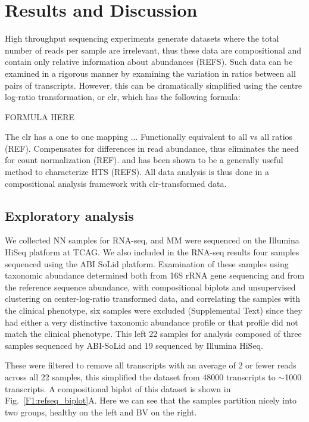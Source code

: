 \documentclass[10pt,letterpaper]{article}
\begin{document}
\section*{Results and Discussion}

High throughput sequencing experiments generate datasets where the total number of reads per sample are irrelevant, thus these data are compositional and contain only relative information about abundances (REFS). Such data can be examined in a rigorous manner by examining the variation in ratios between all pairs of transcripts. However, this can be dramatically simplified using the centre log-ratio transformation, or clr, which has the following formula:

FORMULA HERE

The clr has a one to one mapping ... Functionally equivalent to all vs all ratios (REF). Compensates for differences in read abundance, thus eliminates the need for count normalization (REF).  and has been shown to be a generally useful method to characterize HTS (REFS). All data analysis is thus done in a compositional analysis framework with clr-transformed data. 

\subsection{Exploratory analysis}
We collected NN samples for RNA-seq, and MM were sequenced on the Illumina HiSeq platform at TCAG. We also included in the RNA-seq results four samples sequenced using the ABI SoLid platform. Examination of these samples using taxonomic abundance determined both from 16S rRNA gene sequencing and from the reference sequence abundance, with compositional biplots and unsupervised clustering on center-log-ratio transformed data, and correlating the samples with the clinical phenotype, six samples were excluded (Supplemental Text) since they had either a very distinctive taxonomic abundance profile or that profile did not match the clinical phenotype. This left 22 samples for analysis composed of three samples sequenced by ABI-SoLid and 19 sequenced by Illumina HiSeq. 

These were filtered to remove all transcripts with an average of 2 or fewer reads across all 22 samples, this simplified the dataset from 48000 transcripts to $\sim$1000 transcripts. A compositional biplot of this dataset is shown in Fig.~\ref{F1:refseq_biplot}A. Here we can see that the samples partition nicely into two groups, healthy on the left and BV on the right. 
\end{document}

